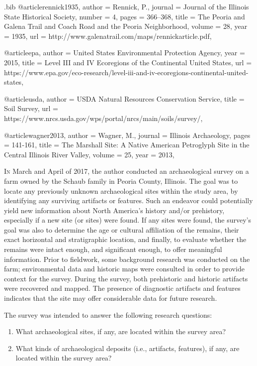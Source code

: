 \begin{filecontents}{\IJSRAidentifier.bib}
	@article{rennick1935,
		author = {Rennick, P.},
		journal = {Journal of the Illinois State Historical Society},
		number = {4},
		pages = {366--368},
		title = {The Peoria and Galena Trail and Coach Road and the Peoria Neighborhood},
		volume = {28},
		year = {1935},
		url = {http://www.galenatrail.com/maps/rennickarticle.pdf},
	}

	@article{epa,
		author = {United States Environmental Protection Agency},
		year = {2015},
		title = {Level III and IV Ecoregions of the Continental United States},
		url = {https://www.epa.gov/eco-research/level-iii-and-iv-ecoregions-continental-united-states},
	}

	@article{usda,
		author = {USDA Natural Resources Conservation Service},
		title = {Soil Survey},
		url = {https://www.nrcs.usda.gov/wps/portal/nrcs/main/soils/survey/},
	}

	@article{wagner2013,
		author = {Wagner, M.},
		journal = {Illinois Archaeology},
		pages = {141-161},
		title = {The Marshall Site: A Native American Petroglyph Site in the Central Illinois River Valley},
		volume = {25},
		year = {2013},
	}
\end{filecontents}

\IJSRAopening
\lettrine{I}{n} March and April of 2017, the author conducted an archaeological survey on a farm owned by the Schaub family in Peoria County, Illinois. The goal was to locate any previously unknown archaeological sites within the study area, by identifying any surviving artifacts or features. Such an endeavor could potentially yield new information about North America’s history and/or prehistory, especially if a new site (or sites) were found. If any sites were found, the survey’s goal was also to determine the age or cultural affiliation of the remains, their exact horizontal and stratigraphic location, and finally, to evaluate whether the remains were intact enough, and significant enough, to offer meaningful information. Prior to fieldwork, some background research was conducted on the farm; environmental data and historic maps were consulted in order to provide context for the survey. During the survey, both prehistoric and historic artifacts were recovered and mapped. The presence of diagnostic artifacts and features indicates that the site may offer considerable data for future research.

The survey was intended to answer the following research questions:

\begin{enumerate}
	\item What archaeological sites, if any, are located within the survey area?
	\item What kinds of archaeological deposits (i.e., artifacts, features), if any, are located within the survey area?
\end{enumerate}

